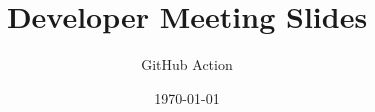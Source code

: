 \documentclass{beamer}
\title{Developer Meeting Slides}
\author{GitHub Action}
\institute{Overleaf}
\date{\today}
\begin{document}
\frame{\titlepage}

\end{document}
